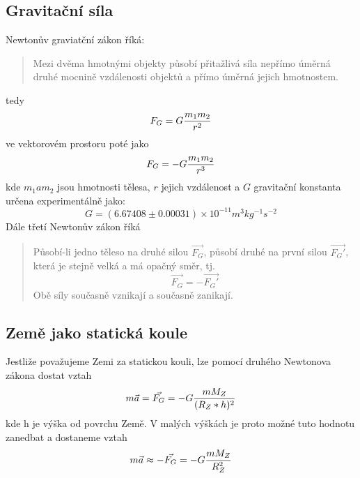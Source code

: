 \documentclass[titlepage]{article}
\begin{document}
        \subsection{Gravitační síla}
            Newtonův graviatční zákon říká:
            \begin{quote}
                Mezi dvěma hmotnými objekty působí přitažlivá síla nepřímo úměrná druhé mocnině vzdálenosti objektů a přímo úměrná jejich hmotnostem.
            \end{quote}
            tedy
            \begin{equation}
                F_G = G{m_1 m_2 \over r^2}
            \end{equation}
            ve vektorovém prostoru poté jako
            \begin{equation}
            	F_G = -G{m_1 m_2 \over r^3}
            \end{equation}
            kde $m_1 a m_2$ jsou hmotnosti tělesa, $r$ jejich vzdálenost a $G$ gravitační konstanta určena experimentálně jako:
            \begin{equation}
                G = (6.67408 \pm 0.00031) \times 10^{-11} m^3kg^{-1}s^{-2}
            \end{equation}
            Dále třetí Newtonův zákon říká
            \begin{quote}
                Působí-li jedno těleso na druhé silou $\vec{F_G}$, působí druhé na první silou $\vec{F_G'}$, která je stejně velká a má opačný směr, tj.
                \begin{equation}
                    \vec{F_G} = -\vec{F_G'}
                \end{equation}
                Obě síly současně vznikají a současně zanikají.
            \end{quote}
        	\subsection{Země jako statická koule}
        		Jestliže považujeme Zemi za statickou kouli, lze pomocí druhého Newtonova zákona dostat vztah
        		\begin{equation}
        			m\vec{a} = \vec{F_G} = -G{m M_Z \over (R_Z * h)^2}
        		\end{equation}
        		kde h je výška od povrchu Země. V malých výškách je proto možné tuto hodnotu zanedbat a dostaneme vztah
        		\begin{equation}
        			m\vec{a} \approx -\vec{F_G} = -G{mM_Z \over R_Z^2}
        		\end{equation}
\end{document}
